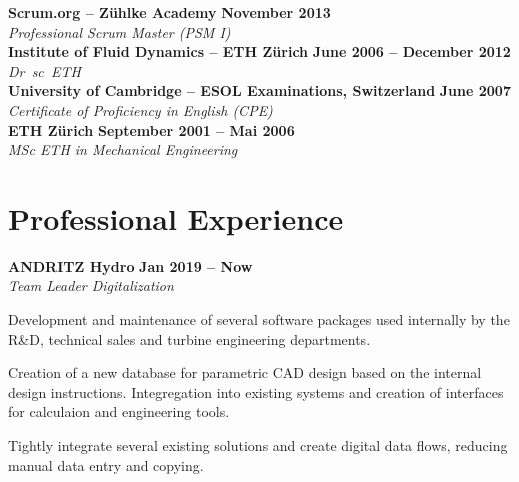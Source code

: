\documentclass[line,11pt,a4paper]{../resume}
\begin{document}
\begin{resume}
\textbf{Scrum.org -- Z\"uhlke Academy} \hfill \textbf{November 2013}%
\vspace{2mm}\\\vspace{1mm}%
\textsl{Professional Scrum Master (PSM I)}%
\vspace{2mm}\\\vspace{-1mm}%
%
\textbf{Institute of Fluid Dynamics -- ETH Z\"urich} \hfill \textbf{June 2006 -- December 2012}%
\vspace{2mm}\\\vspace{1mm}%
\textsl{Dr\ sc\ ETH}%
\vspace{2mm}\\\vspace{-1mm}%
%
\textbf{University of Cambridge -- ESOL Examinations, Switzerland} \hfill \textbf{June 2007}%
\vspace{2mm}\\\vspace{1mm}%
\textsl{Certificate of Proficiency in English (CPE)}%
\vspace{2mm}\\\vspace{-1mm}%
%
\textbf{ETH Z\"urich} \hfill \textbf{September 2001 -- Mai 2006}%
\vspace{2mm}\\\vspace{1mm}%
\textsl{MSc ETH in Mechanical Engineering}%
\vspace{-3mm}\\\vspace{-1mm}%

\section{\mysidestyle Professional Experience}\vspace{2mm}

\textbf{ANDRITZ Hydro} \hfill \textbf{Jan 2019 -- Now }
\vspace{2mm}\\\vspace{1mm}%
\textsl{Team Leader Digitalization}\\
\begin{list2}
  \item Development and maintenance of several software packages used
    internally by the R\&D, technical sales and turbine engineering
    departments.
  \item Creation of a new database for parametric CAD design based on the
    internal design instructions. Integregation into existing systems and
    creation of interfaces for calculaion and engineering tools.
  \item Tightly integrate several existing solutions and create digital
    data flows, reducing manual data entry and copying.
\end{list2}


\end{resume}
\end{document}
